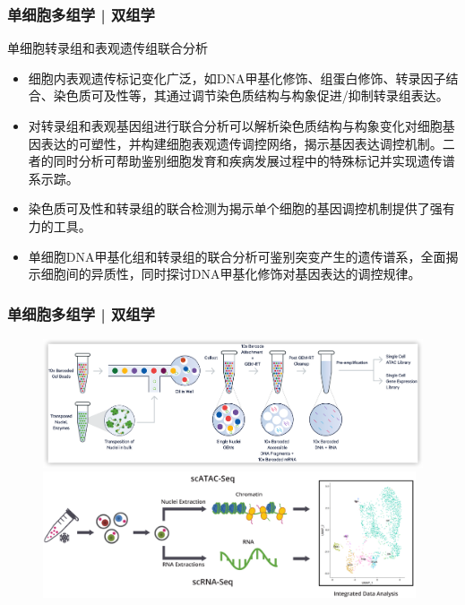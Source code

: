 \documentclass[11pt]{ctexbeamer}
\begin{document}
\begin{frame}
	\frametitle{单细胞多组学 | 双组学}
		\begin{block}{单细胞转录组和表观遗传组联合分析}
			{\small
					\begin{itemize}
				\item 细胞内表观遗传标记变化广泛，如DNA甲基化修饰、组蛋白修饰、转录因子结合、染色质可及性等，其通过调节染色质结构与构象促进/抑制转录组表达。
				\item 对转录组和表观基因组进行联合分析可以解析染色质结构与构象变化对细胞基因表达的可塑性，并构建细胞表观遗传调控网络，揭示基因表达调控机制。二者的同时分析可帮助鉴别细胞发育和疾病发展过程中的特殊标记并实现遗传谱系示踪。
				\item 染色质可及性和转录组的联合检测为\alert{揭示单个细胞的基因调控机制}提供了强有力的工具。
				\item 单细胞DNA甲基化组和转录组的联合分析可鉴别突变产生的遗传谱系，全面揭示细胞间的异质性，同时探讨DNA甲基化修饰对基因表达的调控规律。
			\end{itemize}
		}
	\end{block}
\end{frame}

\begin{frame}
	\frametitle{单细胞多组学 | 双组学}
	\begin{figure}
		\includegraphics[width=\textwidth]{scRNA_scATAC_01.png}\\
        \includegraphics[width=0.98\textwidth]{scRNA_scATAC_02.png}
	\end{figure}
\end{frame}
\end{document}
